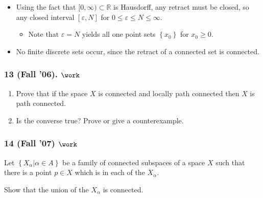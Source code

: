 
\begin{solution}

\envlist

\begin{itemize}
\tightlist
\item
  Using the fact that \([0, \infty) \subset {\mathbb{R}}\) is Hausdorff,
  any retract must be closed, so any closed interval
  \([\varepsilon, N]\) for \(0\leq \varepsilon\leq N \leq \infty\).

  \begin{itemize}
  \tightlist
  \item
    Note that \(\varepsilon= N\) yields all one point sets
    \(\left\{{x_0}\right\}\) for \(x_0 \geq 0\).
  \end{itemize}
\item
  No finite discrete sets occur, since the retract of a connected set is
  connected.
\end{itemize}

\end{solution}

\hypertarget{fall-06.-work-1}{%
\subsubsection{\texorpdfstring{13 (Fall '06).
\(\work\)}{13 (Fall '06). \textbackslash work}}\label{fall-06.-work-1}}

\begin{problem}[Fall 2006, 13]

\envlist

\begin{enumerate}
\def\labelenumi{\alph{enumi}.}
\item
  Prove that if the space \(X\) is connected and locally path connected
  then \(X\) is path connected.
\item
  Is the converse true? Prove or give a counterexample.
\end{enumerate}

\end{problem}

\hypertarget{fall-07-work}{%
\subsubsection{\texorpdfstring{14 (Fall '07)
\(\work\)}{14 (Fall '07) \textbackslash work}}\label{fall-07-work}}

\begin{problem}[?]

Let \(\left\{{X_\alpha \mathrel{\Big|}\alpha \in A}\right\}\) be a
family of connected subspaces of a space \(X\) such that there is a
point \(p \in X\) which is in each of the \(X_\alpha\).

Show that the union of the \(X_\alpha\) is connected.

\end{problem}

